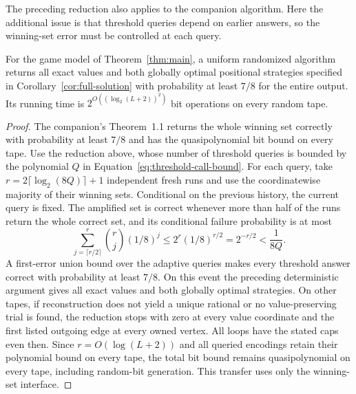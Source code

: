 The preceding reduction also applies to the companion algorithm.
Here the additional issue is that threshold queries depend on earlier
answers, so the winning-set error must be controlled at each query.

\begin{corollary}
\label{cor:randomized-full-solution}
For the game model of Theorem~\ref{thm:main}, a uniform randomized
algorithm returns all exact values and both globally optimal positional
strategies specified in Corollary~\ref{cor:full-solution} with
probability at least $7/8$ for the entire output. Its running time is
$2^{O((\log_2(L+2))^2)}$ bit operations on every random tape.
\end{corollary}

\begin{proof}
The companion's Theorem~1.1 \cite{OpenAI2026Randomized} returns the
whole winning set correctly with probability at least $7/8$ and has
the quasipolynomial bit bound on every tape. Use the reduction above,
whose number of threshold queries is bounded by the polynomial $Q$
in Equation~\eqref{eq:threshold-call-bound}. For each query, take
$r=2\lceil\log_2(8Q)\rceil+1$ independent fresh runs and use the
coordinatewise majority of their winning sets. Conditional on the
previous history, the current query is fixed. The amplified set is
correct whenever more than half of the runs return the whole correct
set, and its conditional failure probability is at most
\[
 \sum_{j=\lceil r/2\rceil}^{r}\binom rj(1/8)^j
 \le 2^r(1/8)^{r/2}=2^{-r/2}<\frac1{8Q}.
\]
A first-error union bound over the adaptive queries makes every
threshold answer correct with probability at least $7/8$. On this
event the preceding deterministic argument gives all exact values and
both globally optimal strategies. On other tapes, if reconstruction
does not yield a unique rational or no value-preserving trial is
found, the reduction stops with zero at every value coordinate and
the first listed outgoing edge at every owned vertex.
All loops have the stated caps even then. Since $r=O(\log(L+2))$ and
all queried encodings retain their polynomial bound on every tape,
the total bit bound remains quasipolynomial on every tape, including
random-bit generation. This transfer uses only the winning-set
interface.
\end{proof}
